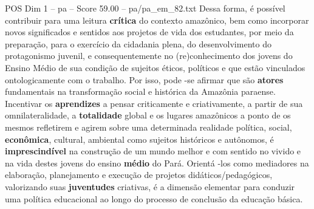 \begin{textsample}{POS Dim 1 – pa – Score 59.00 – pa/pa\_em\_82.txt}
Dessa forma, é possível contribuir para uma leitura \textbf{crítica} do contexto amazônico, bem como incorporar novos significados e sentidos aos projetos de vida dos estudantes, por meio da preparação, para o exercício da cidadania plena, do desenvolvimento do protagonismo juvenil, e consequentemente no (re)conhecimento dos jovens do Ensino Médio de sua condição de sujeitos éticos, políticos e que estão vinculados ontologicamente com o trabalho.
Por isso, pode -se afirmar que são \textbf{atores} fundamentais na transformação social e histórica da Amazônia paraense.
Incentivar os \textbf{aprendizes} a pensar criticamente e criativamente, a partir de sua omnilateralidade, a \textbf{totalidade} global e os lugares amazônicos a ponto de os mesmos refletirem e agirem sobre uma determinada realidade política, social, \textbf{econômica}, cultural, ambiental como sujeitos históricos e autônomos, é \textbf{imprescindível} na construção de um mundo melhor e com sentido no vivido e na vida destes jovens do ensino \textbf{médio} do Pará.
Orientá -los como mediadores na elaboração, planejamento e execução de projetos didáticos/pedagógicos, valorizando suas \textbf{juventudes} criativas, é a dimensão elementar para conduzir uma política educacional ao longo do processo de conclusão da educação básica.

\end{textsample}

